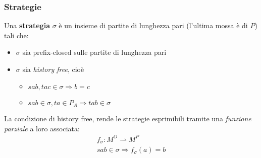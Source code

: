 \documentclass{beamer}
\begin{document}
\begin{frame}

	\frametitle{Strategie}
	
	Una \textbf{strategia} $\sigma$ è un insieme di partite di lunghezza pari (l'ultima mossa è di $P$) tali che:
	\begin{itemize}
		\item<2-> $\sigma$ sia prefix-closed sulle partite di lunghezza pari
		\item<3-> $\sigma$ sia \textit{history free}, cioè
		\begin{itemize}
			\item $sab , tac \in \sigma \Rightarrow b=c$
			\item $sab\in \sigma, ta\in P_A \Rightarrow tab\in \sigma$
		\end{itemize}
	\end{itemize}
	
	
	La condizione di history free, rende le strategie esprimibili tramite una \textit{funzione parziale} a loro associata:
	\begin{gather*}
		    f_\sigma : M^O \rightharpoonup M^P\\
	            sab \in \sigma \Rightarrow f_\sigma(a)=b
	\end{gather*}


	
	
	
%  
	
	
\end{frame}
% 
%  
%  	
%  	
%    
%     
\end{document}
